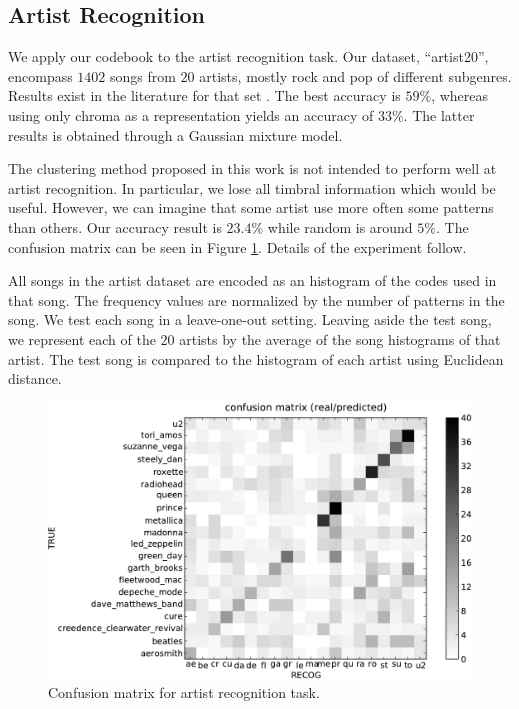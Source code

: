 \documentclass{article}
\begin{document}
\subsection{Artist Recognition} \label{ssec:artist}

We apply our codebook to the artist recognition task.
Our dataset, ``artist20'', encompass $1402$ songs from $20$ artists, 
mostly rock and pop of different subgenres. Results exist in the
literature for that set \cite{Ellis2007}. The best accuracy is
$59\%$, whereas using only chroma as a representation yields an
accuracy of $33\%$. The latter results is obtained through a
Gaussian mixture model.

The clustering method proposed in this work is not
intended to perform well at artist recognition. 
In particular,
we lose all timbral information which would be useful. 
However, we can
imagine that some artist use more often some patterns than others.
Our accuracy result is $23.4\%$ while random
is around $5\%$. 
The confusion matrix can be seen in Figure \ref{fig:conf_mat}.
Details of the experiment follow.

All songs in the artist dataset are encoded as an histogram of the codes
used in that song. The frequency values are normalized by the number
of patterns in the song. We test each song in a leave-one-out setting.
Leaving aside the test song, we represent each of the $20$ artists by the 
average of
the song histograms of that artist. The test song is compared to
the histogram of each artist using Euclidean distance.


\begin{figure}[htb]
\includegraphics[width=.9\columnwidth]{conf_mat_per_artist}
\caption{\small{Confusion matrix for artist recognition task.}}
\label{fig:conf_mat}
\end{figure}
\end{document}

